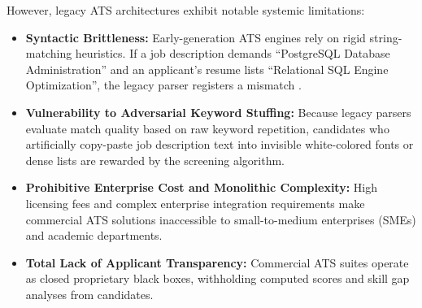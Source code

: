 However, legacy ATS architectures exhibit notable systemic limitations:
\begin{itemize}
    \item \textbf{Syntactic Brittleness:} Early-generation ATS engines rely on rigid string-matching heuristics. If a job description demands ``PostgreSQL Database Administration'' and an applicant’s resume lists ``Relational SQL Engine Optimization'', the legacy parser registers a mismatch \cite{jain2020ats}.
    \item \textbf{Vulnerability to Adversarial Keyword Stuffing:} Because legacy parsers evaluate match quality based on raw keyword repetition, candidates who artificially copy-paste job description text into invisible white-colored fonts or dense lists are rewarded by the screening algorithm.
    \item \textbf{Prohibitive Enterprise Cost and Monolithic Complexity:} High licensing fees and complex enterprise integration requirements make commercial ATS solutions inaccessible to small-to-medium enterprises (SMEs) and academic departments.
    \item \textbf{Total Lack of Applicant Transparency:} Commercial ATS suites operate as closed proprietary black boxes, withholding computed scores and skill gap analyses from candidates.
\end{itemize}

